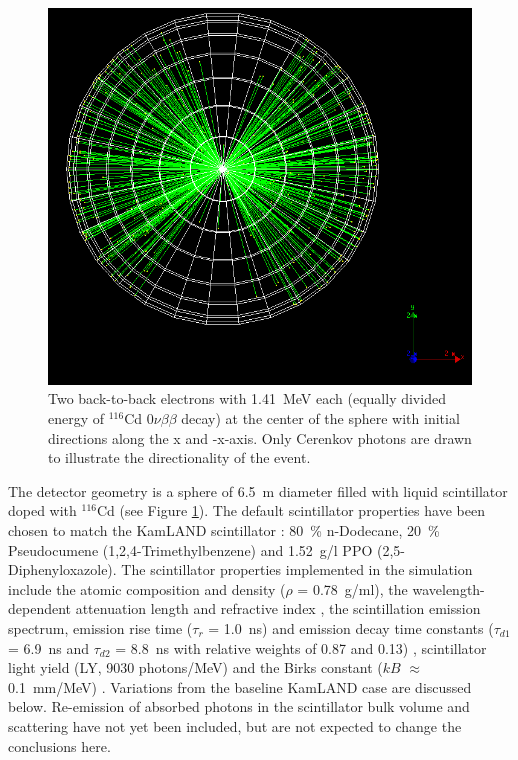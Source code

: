 \documentclass[aps,prc,twocolumn,groupedaddress,showpacs,amsmath,amssymb,floatfix,superscriptaddress]{revtex4}
\begin{document}
\begin{figure}
        \begin{center}
        \includegraphics[scale=0.25]{graphs/detector_view.png}
        \caption[]{Two back-to-back electrons with 1.41~MeV each
        (equally divided energy of $^{116}$Cd $0\nu\beta\beta$ decay) at
        the center of the sphere with initial directions along the x
        and -x-axis. Only Cerenkov photons are drawn to illustrate the
        directionality of the event. \label{detector_view}}
        \end{center}
\end{figure}

The detector geometry is a sphere of 6.5~m diameter filled
with liquid scintillator doped with $^{116}$Cd (see Figure
\ref{detector_view}). The default
scintillator properties have been chosen to match the KamLAND
scintillator \cite{kamland2003}: 80~\% n-Dodecane, 20~\% Pseudocumene
(1,2,4-Trimethylbenzene) and 1.52~g/l PPO (2,5-Diphenyloxazole). The
scintillator properties implemented in the simulation include the
atomic composition and density ($\rho$ = 0.78~g/ml), the
wavelength-dependent attenuation length \cite{tajimaMaster} and
refractive index \cite{OlegThesis}, the scintillation emission
spectrum, emission rise time ($\tau_r$ = 1.0~ns) and emission decay
time constants ($\tau_{d1}$ = 6.9~ns and $\tau_{d2}$ = 8.8~ns with
relative weights of 0.87 and 0.13)
\cite{tajimaThesis}, scintillator light yield (LY, 9030 photons/MeV)
and the Birks constant ($kB$ $\approx$ 0.1~mm/MeV)
\cite{ChrisThesis}. Variations from the baseline KamLAND case are
discussed below. Re-emission of absorbed photons in the scintillator
bulk volume and scattering have not yet been included, but are not
expected to change the conclusions here.
\end{document}
